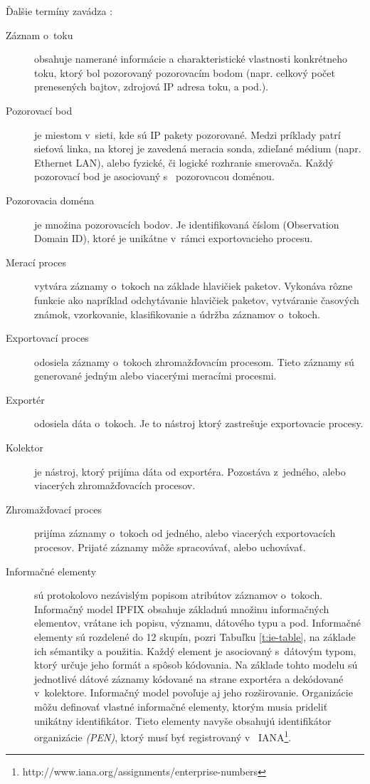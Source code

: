 Ďalšie termíny zavádza \citep{rfc5101}:
\begin{description}
  \item[Záznam o~toku] obsahuje namerané informácie a charakteristické vlastnosti 
konkrétneho toku, ktorý bol pozorovaný pozorovacím bodom (napr. celkový počet prenesených 
bajtov, zdrojová IP adresa toku, a pod.).

  \item[Pozorovací bod] je miestom v~sieti, kde sú IP pakety pozorované. Medzi príklady patrí 
sieťová linka, na ktorej je zavedená meracia sonda, zdieľané médium (napr. Ethernet LAN), 
alebo fyzické, či logické rozhranie smerovača. Každý pozorovací bod je asociovaný s~
pozorovacou doménou. 

  \item[Pozorovacia doména] je množina pozorovacích bodov. Je identifikovaná číslom 
(Observation Domain ID), ktoré je unikátne v~rámci exportovacieho procesu. 

  \item[Merací proces] vytvára záznamy o~tokoch na základe hlavičiek paketov. Vykonáva 
rôzne funkcie ako napríklad odchytávanie hlavičiek paketov, vytváranie časových známok, 
vzorkovanie, klasifikovanie a údržba záznamov o~tokoch. 

  \item[Exportovací proces] odosiela záznamy o~tokoch zhromažďovacím 
procesom. Tieto záznamy sú generované jedným alebo viacerými meracími procesmi.
	
  \item[Exportér] odosiela dáta o~tokoch. Je to nástroj ktorý zastrešuje exportovacie procesy.

  \item[Kolektor] je nástroj, ktorý prijíma dáta od exportéra. Pozostáva z~jedného, alebo
viacerých zhromažďovacích procesov.

  \item[Zhromažďovací proces] prijíma záznamy o~tokoch od jedného, alebo viacerých 
exportovacích procesov. Prijaté záznamy môže spracovávať, alebo uchovávať. 

  \item[Informačné elementy] sú protokolovo nezávislým popisom atribútov záznamov o~tokoch. 
Informačný model IPFIX \citep{rfc5102} obsahuje základnú množinu informačných elementov, vrátane ich
popisu, významu, dátového typu a pod. Informačné elementy sú rozdelené do 12 skupín, pozri Tabuľku \ref{t:ie-table},
na základe ich sémantiky a použitia. Každý element je asociovaný s~dátovým typom, ktorý určuje jeho 
formát a spôsob kódovania.
Na základe tohto modelu sú jednotlivé dátové záznamy kódované na strane exportéra a dekódované 
v~kolektore.
Informačný model povoľuje aj jeho rozširovanie. Organizácie môžu definovať vlastné informačné
elementy, ktorým musia prideliť unikátny identifikátor. 
Tieto elementy navyše obsahujú identifikátor organizácie \emph{(PEN)}, ktorý musí byť registrovaný v~
IANA\footnote{http://www.iana.org/assignments/enterprise-numbers}.


\end{description}

